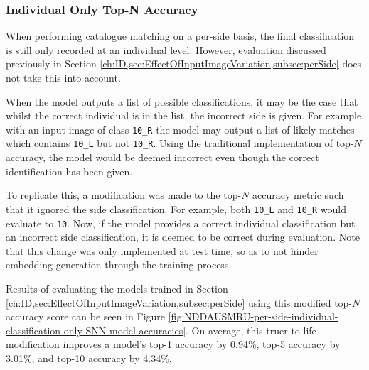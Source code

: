 \subsubsection{Individual Only Top-N Accuracy}\label{ch:ID,sec:EffectOfInputImageVariation,subsec:perSide,sub:individualOnlyTopN}

When performing catalogue matching on a per-side basis, the final classification is still only recorded at an individual level. However, evaluation discussed previously in Section \ref{ch:ID,sec:EffectOfInputImageVariation,subsec:perSide} does not take this into account. 

When the model outputs a list of possible classifications, it may be the case that whilst the correct individual is in the list, the incorrect side is given. For example, with an input image of class \texttt{10\_R} the model may output a list of likely matches which contains \texttt{10\_L} but not \texttt{10\_R}. Using the traditional implementation of top-$N$ accuracy, the model would be deemed incorrect even though the correct identification has been given. 

To replicate this, a modification was made to the top-$N$ accuracy metric such that it ignored the side classification. For example, both \texttt{10\_L} and \texttt{10\_R} would evaluate to \texttt{10}. Now, if the model provides a correct individual classification but an incorrect side classification, it is deemed to be correct during evaluation. Note that this change was only implemented at test time, so as to not hinder embedding generation through the training process. 

Results of evaluating the models trained in Section \ref{ch:ID,sec:EffectOfInputImageVariation,subsec:perSide} using this modified top-$N$ accuracy score can be seen in Figure \ref{fig:NDDAUSMRU-per-side-individual-classification-only-SNN-model-accuracies}. On average, this truer-to-life modification improves a model's top-1 accuracy by 0.94\%, top-5 accuracy by 3.01\%, and top-10 accuracy by 4.34\%.

